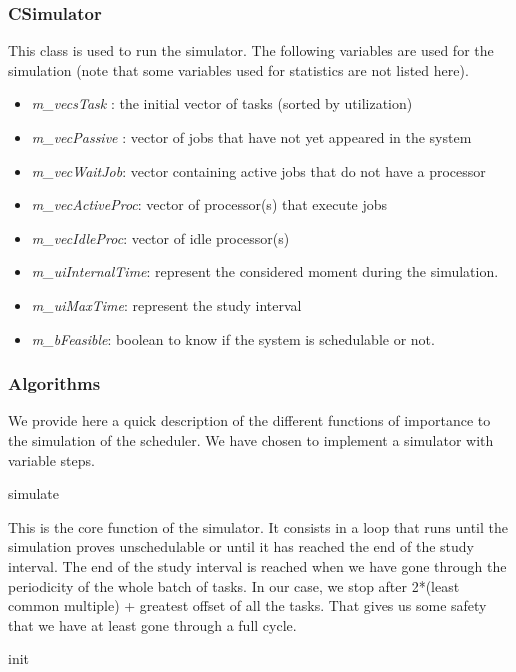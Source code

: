 \documentclass[11pt, a4paper,titlepage]{article}
\begin{document}
\subsubsection*{CSimulator}
This class is used to run the simulator. The following variables are used for the simulation (note that some variables used for statistics are not listed here).
\begin{itemize}
\item \emph{m\_vecsTask} : the initial vector of tasks (sorted by utilization)
\item \emph{m\_vecPassive} : vector of jobs that have not yet appeared in the system
\item \emph{m\_vecWaitJob}: vector containing active jobs that do not have a processor
\item \emph{m\_vecActiveProc}: vector of processor(s) that execute jobs
\item \emph{m\_vecIdleProc}: vector of idle processor(s)
\item \emph{m\_uiInternalTime}: represent the considered moment during the simulation.
\item \emph{m\_uiMaxTime}: represent the study interval
\item \emph{m\_bFeasible}: boolean to know if the system is schedulable or not.
\end{itemize}

\subsubsection{Algorithms}

We provide here a quick description of the different functions of importance to the simulation of the scheduler. We have chosen to implement a simulator with variable steps.

\begin{description}
\item [simulate] \hfill
\end{description}

This is the core function of the simulator. It consists in a loop that runs until the simulation proves unschedulable or until it has reached the end of the study interval. The end of the study interval is reached when we have gone through the periodicity of the whole batch of tasks. In our case, we stop after 2*(least common multiple) + greatest offset of all the tasks. That gives us some safety that we have at least gone through a full cycle.
\begin{description}
\item [init] \hfill
\end{description}
\end{document}
